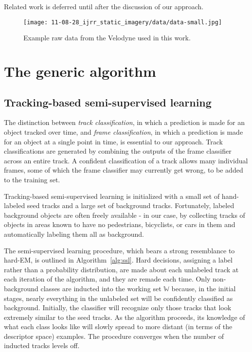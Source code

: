 \documentclass[conference]{IEEEtran}
\begin{document}
Related work is deferred until after the discussion of our approach.


\begin{figure}
  \centering
  \texttt{[image: 11-08-28\_ijrr\_static\_imagery/data/data-small.jpg]}
  \caption{Example raw data from the Velodyne used in this work.}
  \label{fig:data}
\end{figure}

\section{The generic algorithm}

\subsection{Tracking-based semi-supervised learning}

\renewcommand{\S}{\ensuremath{\mathbb{S}}\xspace}
\newcommand{\U}{\ensuremath{\mathbb{U}}\xspace}
\newcommand{\B}{\ensuremath{\mathbb{B}}\xspace}
\newcommand{\W}{\ensuremath{\mathbb{W}}\xspace}
\newcommand{\C}{\ensuremath{\mathbb{C}}\xspace}

The distinction between \textit{track classification}, in which a prediction is made for an object tracked over time, and \textit{frame classification}, in which a prediction is made for an object at a single point in time, is essential to our approach.  Track classifications are generated by combining the outputs of the frame classifier across an entire track.  A confident classification of a track allows many individual frames, some of which the frame classifier may currently get wrong, to be added to the training set.

Tracking-based semi-supervised learning is initialized with a small set of hand-labeled seed tracks and a large set of background tracks.  Fortunately, labeled background objects are often freely available - in our case, by collecting tracks of objects in areas known to have no pedestrians, bicyclists, or cars in them and automatically labeling them all as background.  

The semi-supervised learning procedure, which bears a strong resemblance to hard-EM, is outlined in Algorithm~\ref{alg:ssl}.  Hard decisions, \ie assigning a label rather than a probability distribution, are made about each unlabeled track at each iteration of the algorithm, and they are remade each time.  Only non-background classes are inducted into the working set \W because, in the initial stages, nearly everything in the unlabeled set will be confidently classified as background.  Initially, the classifier will recognize only those tracks that look extremely similar to the seed tracks.  As the algorithm proceeds, its knowledge of what each class looks like will slowly spread to more distant (in terms of the descriptor space) examples.  The procedure converges when the number of inducted tracks levels off.
\end{document}
